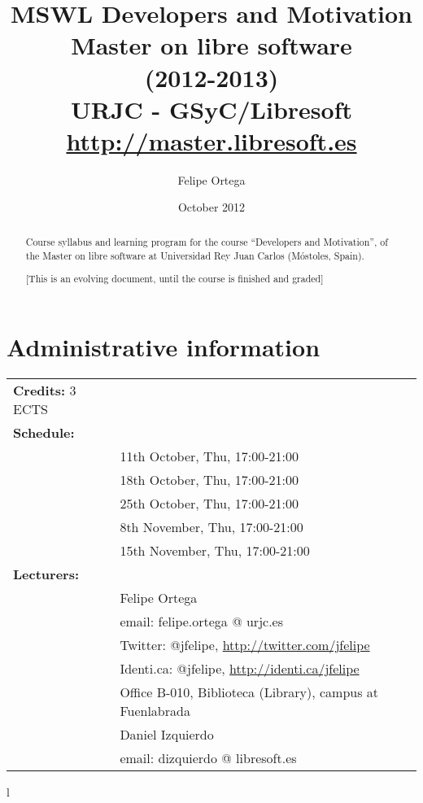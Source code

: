 \documentclass[a4paper]{article}
\title{MSWL Developers and Motivation \\
Master on libre software \\
(2012-2013) \\
URJC - GSyC/Libresoft \\
\url{http://master.libresoft.es}}
\author{Felipe Ortega}
\date{October 2012}
\begin{document}
\maketitle

\begin{abstract}
Course syllabus and learning program for the course ``Developers and Motivation'', of the Master on libre software at Universidad Rey Juan Carlos (Móstoles, Spain).

[This is an evolving document, until the course is finished and graded]
\end{abstract}

\tableofcontents

\section{Administrative information}

\begin{tabular}{ll}
\textbf{Credits:} 3 ECTS \\
\textbf{Schedule:} \\
& 11th October, Thu, 17:00-21:00 \\
& 18th October, Thu, 17:00-21:00 \\
& 25th October, Thu, 17:00-21:00 \\
& 8th November, Thu, 17:00-21:00 \\
& 15th November, Thu, 17:00-21:00 \\
\textbf{Lecturers:} \\
& Felipe Ortega \\
& \hspace{1cm} email: felipe.ortega @ urjc.es \\
& \hspace{1cm} Twitter: @jfelipe, \url{http://twitter.com/jfelipe} \\
& \hspace{1cm} Identi.ca: @jfelipe, \url{http://identi.ca/jfelipe} \\
& \hspace{1cm} Office B-010, Biblioteca (Library), campus at Fuenlabrada \\
& Daniel Izquierdo \\
& \hspace{1cm} email: dizquierdo @ libresoft.es \\
\end{tabular}{l}
\end{document}
